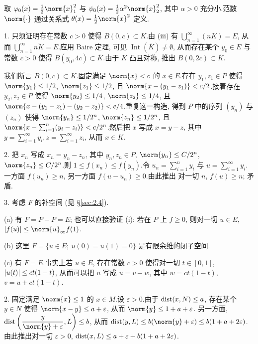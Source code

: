 
取 $\varphi_0(x)=\frac12\norm{x}_1^2$ 与 $\psi_0(x)=\frac12\alpha^2\norm{x}_2^2$, 其中
$\alpha>0$ 充分小.范数 $\norm{\cdot}$ 通过关系式 $\theta(x)=\frac12\norm{x}^2$ 定义.



1. 只须证明存在常数 $c>0$ 使得 $B(0,c)\subset K$.由 (iii) 有 $\bigcup_{n=1}^\infty(nK)=E$,
从而 $\bigcup_{n=1}^\infty\overline{nK}=E$.应用 Baire 定理, 可见
$\operatorname{Int}(\overline K)\ne\emptyset$, 从而存在某个 $y_0\in E$ 与常数 $c>0$
使得 $B(y_0,4c)\subset\overline K$.由于 $K$ 凸且对称, 推出 $B(0,2c)\subset\overline K$.

我们断言 $B(0,c)\subset K$.固定满足 $\norm{x}<c$ 的 $x\in E$.存在 $y_1,z_1\in P$
使得 $\norm{y_1}\le1/2$, $\norm{z_1}\le1/2$, 且 $\norm{x-(y_1-z_1)}<c/2$.接着存在
$y_2,z_2\in P$ 使得 $\norm{y_2}\le1/4$, $\norm{z_2}\le1/4$, 且
$\norm{x-(y_1-z_1)-(y_2-z_2)}<c/4$.重复这一构造, 得到 $P$ 中的序列 $(y_n)$ 与 $(z_n)$
使得 $\norm{y_n}\le1/2^n$, $\norm{z_n}\le1/2^n$, 且
$\norm{x-\sum_{i=1}^n(y_i-z_i)}<c/2^n$.然后把 $x$ 写成 $x=y-z$, 其中
$y=\sum_{i=1}^\infty y_i,z=\sum_{i=1}^\infty z_i$, 从而 $x\in K$.

2. 把 $x_n$ 写成 $x_n=y_n-z_n$, 其中 $y_n,z_n\in P$, $\norm{y_n}\le C/2^n$,
$\norm{z_n}\le C/2^n$.则 $1\le f(x_n)\le f(y_n)$.令 $u_n=\sum_{i=1}^ny_i$ 与
$u=\sum_{i=1}^\infty y_i$.一方面 $f(u_n)\ge n$, 另一方面 $f(u-u_n)\ge0$.由此推出
对一切 $n$, $f(u)\ge n$; 矛盾.

3. 考虑 $F$ 的补空间 (见 \S \ref{sec:2.4}).


(a) 有 $F=P-P=E$; 也可以直接验证 (i): 若在 $P$ 上 $f\ge0$, 则对一切 $u\in E$,
$\abs{f(u)}\le\norm{u}_\infty f(1)$.

(b) 这里 $F=\{u\in E;\ u(0)=u(1)=0\}$ 是有限余维的闭子空间.

(c) 有 $F=E$.事实上若 $u\in E$, 存在常数 $c>0$ 使得对一切 $t\in[0,1]$,
$\left|u(t)\right|\le ct(1-t)$, 从而可以把 $u$ 写成 $u=v-w$, 其中 $w=ct(1-t)$, $v=u+ct(1-t)$.


2. 固定满足 $\norm{x}\le1$ 的 $x\in M$.设 $\varepsilon>0$.由于 $\operatorname{dist}(x,N)\le a$,
存在某个 $y\in N$ 使得 $\norm{x-y}\le a+\varepsilon$, 从而 $\norm{y}\le 1+a+\varepsilon$.
另一方面, $\dist\left(\dfrac{y}{\norm{y}+\varepsilon},L\right)\le b$, 从而
$\dist(y,L)\le b(\norm{y}+\varepsilon)\le b(1+a+2\varepsilon)$.由此推出对一切 $\varepsilon>0$,
$\operatorname{dist}(x,L)\le a+\varepsilon+b(1+a+2\varepsilon)$.

